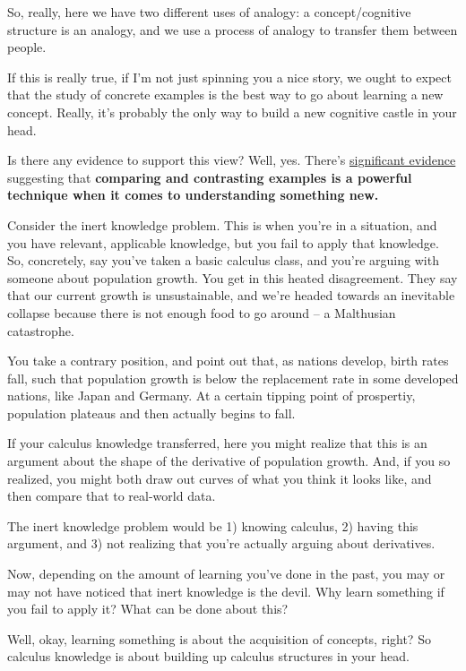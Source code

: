So, really, here we have two different uses of analogy: a
concept/cognitive structure is an analogy, and we use a process of
analogy to transfer them between people.

If this is really true, if I'm not just spinning you a nice story, we
ought to expect that the study of concrete examples is the best way to
go about learning a new concept. Really, it's probably the only way to
build a new cognitive castle in your head.

Is there any evidence to support this view? Well, yes. There's
\href{http://psycnet.apa.org/journals/edu/95/2/393/}{significant
evidence} suggesting that \textbf{comparing and contrasting examples is
a powerful technique when it comes to understanding something new.}

Consider the inert knowledge problem. This is when you're in a
situation, and you have relevant, applicable knowledge, but you fail to
apply that knowledge. So, concretely, say you've taken a basic calculus
class, and you're arguing with someone about population growth. You get
in this heated disagreement. They say that our current growth is
unsustainable, and we're headed towards an inevitable collapse because
there is not enough food to go around -- a Malthusian catastrophe.

You take a contrary position, and point out that, as nations develop,
birth rates fall, such that population growth is below the replacement
rate in some developed nations, like Japan and Germany. At a certain
tipping point of prospertiy, population plateaus and then actually
begins to fall.

If your calculus knowledge transferred, here you might realize that this
is an argument about the shape of the derivative of population growth.
And, if you so realized, you might both draw out curves of what you
think it looks like, and then compare that to real-world data.

The inert knowledge problem would be 1) knowing calculus, 2) having this
argument, and 3) not realizing that you're actually arguing about
derivatives.

Now, depending on the amount of learning you've done in the past, you
may or may not have noticed that inert knowledge is the devil. Why learn
something if you fail to apply it? What can be done about this?

Well, okay, learning something is about the acquisition of concepts,
right? So calculus knowledge is about building up calculus structures in
your head.


